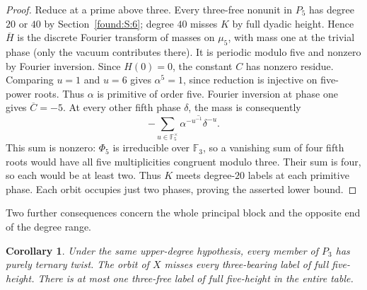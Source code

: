 \documentclass[11pt,a4paper]{article}
\numberwithin{equation}{section}
\newtheorem{corollary}[theorem]{Corollary}
\theoremstyle{remark}
\begin{document}
\begin{proof}
Reduce at a prime above three. Every three-free nonunit in $P_5$ has
degree $20$ or $40$ by Section~\ref{found:S:6}; degree $40$ misses $K$ by full
dyadic height. Hence $\overline H$ is the discrete Fourier transform
of masses on $\mu_5$, with mass one at the trivial phase (only the
vacuum contributes there). It is periodic modulo five and nonzero
by Fourier inversion. Since $H(0)=0$, the constant $C$ has nonzero
residue. Comparing $u=1$ and $u=6$ gives $\alpha^5=1$, since reduction
is injective on five-power roots. Thus $\alpha$ is primitive of order
five. Fourier inversion at phase one gives $\overline C=-5$. At every
other fifth phase $\delta$, the mass is consequently
\[
       -\sum_{u\in\mathbb F_5^\times}
                \overline{\alpha^{-u^{-1}}\delta^{-u}} .
\]
This sum is nonzero: $\Phi_5$ is irreducible over $\mathbb F_3$,
so a vanishing sum of four fifth roots would have all five multiplicities
congruent modulo three. Their sum is four, so each would be at least
two. Thus $K$ meets degree-$20$ labels at each primitive phase. Each
orbit occupies just two phases, proving the asserted lower bound.
\end{proof}

Two further consequences concern the whole principal block and the
opposite end of the degree range.

\begin{corollary}\label{found:T:4.2}\label{found:T:key:cor:missing-six-purity}
Under the same upper-degree hypothesis, every member of $P_3$ has
purely ternary twist. The orbit of $X$ misses every three-bearing label
of full five-height. There is at most one three-free label of full
five-height in the entire table.
\end{corollary}
\end{document}
